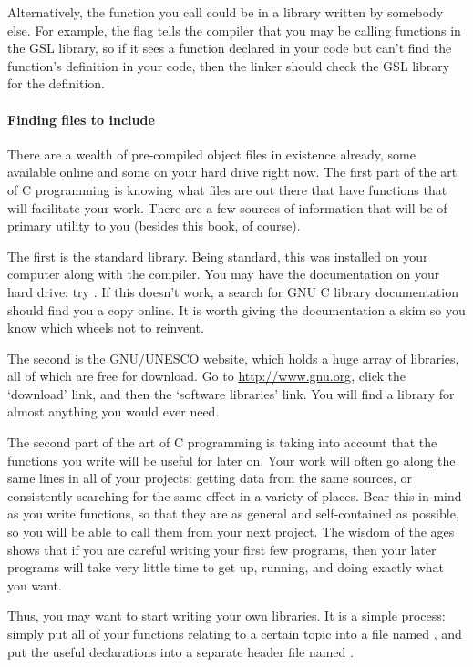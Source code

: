 \documentclass[12pt]{article}
\begin{document}
Alternatively, the function you call could be in a library written by
somebody else.  For example, the  flag tells the compiler that
you may be calling functions in the GSL library, so if it sees a function
declared in your code but can't find the function's definition in your
code, then the linker should check the GSL library for the definition.


\paragraph{Finding files to include}
There are a wealth of pre-compiled object files in existence already,
some available online and some on your hard drive right now.  The first
part of the art of C programming is knowing what files are out there that have
functions that will facilitate your work. There
are a few sources of information that will be of primary utility to you
(besides this book, of course).

The first is the standard library. Being standard, this was
installed on your computer along with the compiler. You may have the
documentation on your hard drive: try . If this doesn't
work, a search for GNU C library documentation should find you a copy
online. It is worth giving the documentation a skim so you know which wheels not to reinvent.

The second is the GNU/UNESCO website, which holds a huge array
of libraries, all of which are free for download. Go to \url{http://www.gnu.org}, click the `download' link, and then the `software
libraries' link. You will find a library for almost anything you would
ever need.

The second part of the art of C programming is taking into account that
the functions you write will be useful for later on. Your work will often
go along the same lines in all of your projects: getting data from the
same sources, or consistently searching for the same effect in a
variety of places. Bear this in mind as you write functions, so that they
are as general and self-contained as possible, so you will be able to call
them from your next project. The wisdom of the ages shows that if you are
careful writing your first few programs, then your later programs will
take very little time to get up, running, and doing exactly what you want.

Thus, you may want to start writing your own libraries. It is a simple
process: simply put all of your functions relating to a certain topic
into a file named , and put the useful declarations into a separate header file named . 
\end{document}
